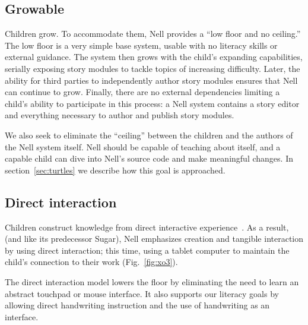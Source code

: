 \documentclass[preprint]{sig-alternate}
\begin{document}
\subsection{Growable}


Children grow. To accommodate them, Nell provides a ``low floor and
no ceiling.''  The low
floor is a very simple base system, usable with no literacy skills or
external guidance.  The system then grows with the child's expanding
capabilities, serially exposing story modules to tackle topics of
increasing difficulty.  Later, the ability for third
parties to independently author story modules ensures that
Nell can continue to grow.  Finally, there are no external dependencies
limiting a child's ability to participate in this process: a Nell
system contains a story editor and everything necessary to
author and publish story modules.

We also seek to eliminate the ``ceiling'' between the children and
the authors of the Nell system itself.  Nell should be capable of
teaching about itself, and a capable child can dive into Nell's source
code and make meaningful changes.  In section~\ref{sec:turtles} we
describe how this goal is approached.


\subsection{Direct interaction}

Children construct knowledge from direct interactive
experience~\cite{Papert91}. As a result, (and like its predecessor Sugar), Nell
emphasizes creation and tangible interaction by using direct interaction; this
time, using a tablet computer to maintain the child's connection to their work
(Fig.~\ref{fig:xo3}).

The direct interaction model lowers the floor by eliminating the need
to learn an abstract touchpad or mouse interface.  It also supports
our literacy goals by allowing direct handwriting instruction and the
use of handwriting as an interface.
\end{document}
